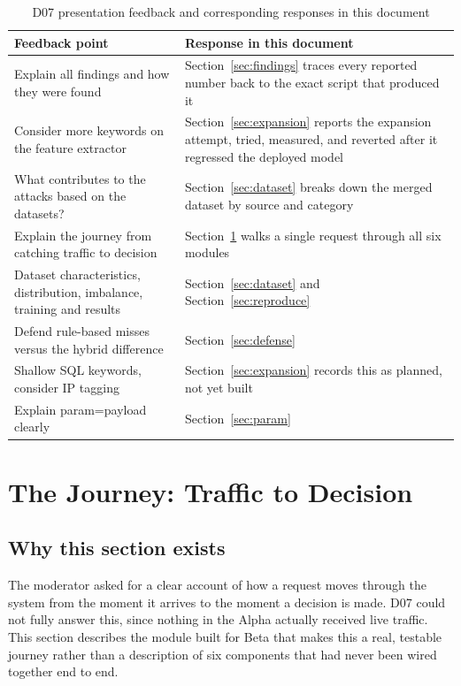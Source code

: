 \documentclass{llncs}
\begin{document}
\begin{table}[h]
\centering
\caption{D07 presentation feedback and corresponding responses in this document}
\label{tab:feedback}
\begin{tabular}{p{}p{}}
\toprule
\textbf{Feedback point} & \textbf{Response in this document} \\
\midrule
Explain all findings and how they were found &
Section~\ref{sec:findings} traces every reported number back to the
exact script that produced it \\
Consider more keywords on the feature extractor &
Section~\ref{sec:expansion} reports the expansion attempt, tried,
measured, and reverted after it regressed the deployed model \\
What contributes to the attacks based on the datasets? &
Section~\ref{sec:dataset} breaks down the merged dataset by source and
category \\
Explain the journey from catching traffic to decision &
Section~\ref{sec:m1} walks a single request through all six modules \\
Dataset characteristics, distribution, imbalance, training and results &
Section~\ref{sec:dataset} and Section~\ref{sec:reproduce} \\
Defend rule-based misses versus the hybrid difference &
Section~\ref{sec:defense} \\
Shallow SQL keywords, consider IP tagging &
Section~\ref{sec:expansion} records this as planned, not yet built \\
Explain param={payload} clearly &
Section~\ref{sec:param} \\
\bottomrule
\end{tabular}
\end{table}

\clearpage
\section{The Journey: Traffic to Decision}
\label{sec:m1}

\subsection{Why this section exists}
The moderator asked for a clear account of how a request moves through
the system from the moment it arrives to the moment a decision is made.
D07 could not fully answer this, since nothing in the Alpha actually
received live traffic. This section describes the module built for
Beta that makes this a real, testable journey rather than a description
of six components that had never been wired together end to end.
\end{document}
